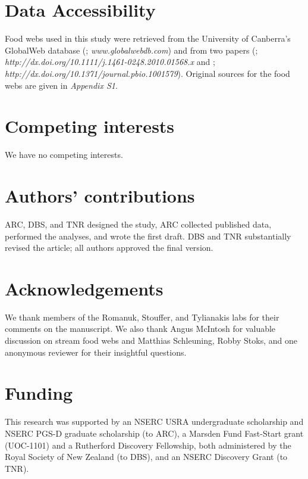 \documentclass[12pt]{article}
\begin{document}
\section*{Data Accessibility}

  Food webs used in this study were retrieved from the University of Canberra's 
  GlobalWeb database (\cite{GlobalWeb}; \emph{www.globalwebdb.com}) and from
  two papers (\cite{Riede2011}; \emph{http://dx.doi.org/10.1111/j.1461-0248.2010.01568.x}
  and \cite{Dunne2013}; \emph{http://dx.doi.org/10.1371/journal.pbio.1001579}). Original sources for the
  food webs are given in \emph{Appendix S1}.

\section*{Competing interests}
  
  We have no competing interests.

\section*{Authors' contributions}
  
  ARC, DBS, and TNR designed the study, ARC collected
  published data, performed the analyses, and wrote the
  first draft. DBS and TNR substantially revised the article;
  all authors approved the final version.


\section*{Acknowledgements}
  
  We thank members of the Romanuk, Stouffer, and Tylianakis labs for their comments on
  the manuscript. We also thank Angus McIntosh for valuable discussion on stream food webs and Matthias Schleuning, Robby Stoks, and one anonymous reviewer for their insightful questions.

\section*{Funding}
  This research was supported by an NSERC USRA undergraduate scholarship and NSERC PGS-D 
  graduate scholarship (to ARC), a Marsden Fund Fast-Start grant (UOC-1101) and a 
  Rutherford Discovery Fellowship, both administered by the Royal Society of New Zealand 
  (to DBS), and an NSERC Discovery Grant (to TNR).


\newpage


\end{document}
